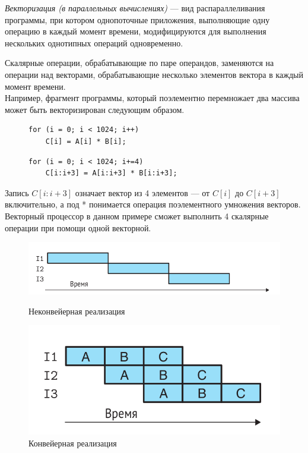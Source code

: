 \documentclass[a4paper, 12pt]{article}
\begin{document}
\textit{Векторизация (в параллельных вычислениях)} — вид распараллеливания программы, при котором однопоточные приложения, выполняющие одну операцию в каждый момент времени, модифицируются для выполнения нескольких однотипных операций одновременно.

Скалярные операции, обрабатывающие по паре операндов, заменяются на операции над векторами, обрабатывающие несколько элементов вектора в каждый момент времени.\\

Например,  фрагмент программы, который поэлементно перемножает два массива может быть векторизирован следующим образом.

\begin{figure}[!htb]
   \begin{minipage}{0.48\textwidth}
    \begin{lstlisting}
for (i = 0; i < 1024; i++)
    C[i] = A[i] * B[i];
    \end{lstlisting}
   \end{minipage}\hfill
   \begin{minipage}{0.48\textwidth}
    \begin{lstlisting}
for (i = 0; i < 1024; i+=4)
    C[i:i+3] = A[i:i+3] * B[i:i+3];
    \end{lstlisting}
   \end{minipage}
\end{figure}

Запись $C[i:i+3]$ означает вектор из 4 элементов — от $C[i]$ до $C[i+3]$ включительно, а под * понимается операция поэлементного умножения векторов. Векторный процессор в данном примере сможет выполнить 4 скалярные операции при помощи одной векторной.\\

\begin{figure}[!htb]
    \begin{minipage}{0.48\textwidth}
        \centering
        \includegraphics[width=1\linewidth]{scalar_example.png}
        \caption{Неконвейерная реализация}
    \end{minipage}\hfill
    \begin{minipage}{0.48\textwidth}
        \centering
        \includegraphics[width=1\linewidth]{parallel_example.png}
        \caption{Конвейерная реализация}
    \end{minipage}
\end{figure}
\end{document}
